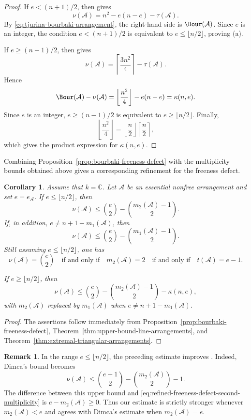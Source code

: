 \documentclass[11pt]{amsart}   %
\newtheorem{Corollary}[Theorem]{Corollary}
\theoremstyle{definition}
\newtheorem{Remark}[Theorem]{Remark}
\def\NZQ{\mathbb}               %
\def\CC{{\NZQ C}}
\def\A{{\mathcal A}}
\begin{document}
\begin{proof}
If $e<(n+1)/2$, then \cite[Theorem~1.7(1)]{Dimca-minimal-Tjurina} gives
\[
\nu(\A)=n^2-e(n-e)-\tau(\A).
\]
By \eqref{eq:tjurina-bourbaki-arrangement}, the right-hand side is $\Bour(\A)$. Since $e$ is an integer, the condition $e<(n+1)/2$ is equivalent to $e\leq\lfloor n/2\rfloor$, proving (a).

If $e\geq(n-1)/2$, then \cite[Theorem~1.7(2)]{Dimca-minimal-Tjurina} gives
\[
\nu(\A)
=
\left\lceil\frac{3n^2}{4}\right\rceil-\tau(\A).
\]
Hence
\[
\Bour(\A)-\nu(\A)
=
\left\lfloor\frac{n^2}{4}\right\rfloor-e(n-e)
=
\kappa(n,e).
\]
Since $e$ is an integer, $e\geq(n-1)/2$ is equivalent to $e\geq\lfloor n/2\rfloor$. Finally,
\[
\left\lfloor\frac{n^2}{4}\right\rfloor
=
\left\lfloor\frac n2\right\rfloor
\left\lceil\frac n2\right\rceil,
\]
which gives the product expression for $\kappa(n,e)$.
\end{proof}

Combining Proposition~\ref{prop:bourbaki-freeness-defect} with the multiplicity bounds obtained above gives a corresponding refinement for the freeness defect.

\begin{Corollary}
\label{cor:refined-freeness-defect-bound}
Assume that $k=\CC$. Let $\A$ be an essential nonfree arrangement and set $e=e_\A$. If $e\leq\lfloor n/2\rfloor$, then
\begin{equation}
\label{eq:refined-freeness-defect-second-multiplicity}
\nu(\A)
\leq
\binom e2-\binom{m_2(\A)-1}{2}.
\end{equation}
If, in addition, $e\neq n+1-m_1(\A)$, then
\[
\nu(\A)
\leq
\binom e2-\binom{m_1(\A)-1}{2}.
\]
Still assuming $e\leq\lfloor n/2\rfloor$, one has
\[
\nu(\A)=\binom e2
\quad\text{if and only if}\quad
m_2(\A)=2
\quad\text{if and only if}\quad t(\A)=e-1.
\]

If $e\geq\lfloor n/2\rfloor$, then
\[
\nu(\A)
\leq
\binom e2-\binom{m_2(\A)-1}{2}-\kappa(n,e),
\]
with $m_2(\A)$ replaced by $m_1(\A)$ when $e\neq n+1-m_1(\A)$.
\end{Corollary}

\begin{proof}
The assertions follow immediately from Proposition~\ref{prop:bourbaki-freeness-defect}, Theorem~\ref{thm:upper-bound-line-arrangements}, and Theorem~\ref{thm:extremal-triangular-arrangements}.
\end{proof}

\begin{Remark}
\label{rem:freeness-defect-comparison}
In the range $e\leq\lfloor n/2\rfloor$, the preceding estimate improves \cite[Corollary~1.8]{Dimca-minimal-Tjurina}. Indeed, Dimca's bound becomes
\[
\nu(\A)
\leq
\binom{e+1}{2}-\binom{m_2(\A)}2-1.
\]
The difference between this upper bound and \eqref{eq:refined-freeness-defect-second-multiplicity} is $e-m_2(\A)\geq0$. Thus our estimate is strictly stronger whenever $m_2(\A)<e$ and agrees with Dimca's estimate when $m_2(\A)=e$.
\end{Remark}
\end{document}
